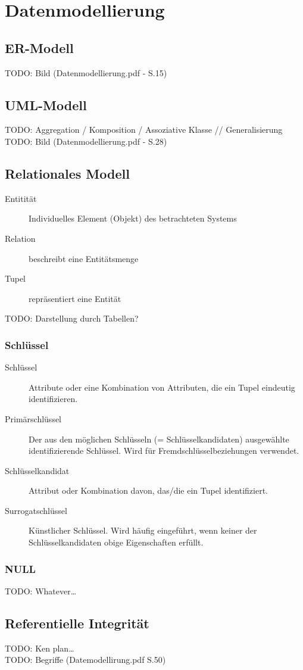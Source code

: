 \section{Datenmodellierung}
\subsection{ER-Modell}
TODO: Bild (Datenmodellierung.pdf - S.15) \\
\subsection{UML-Modell}
TODO: Aggregation / Komposition / Assoziative Klasse // Generalisierung \\
TODO: Bild (Datenmodellierung.pdf - S.28) \\
\subsection{Relationales Modell}
\begin{description}
    \item[Entitität] Individuelles Element (Objekt) des betrachteten Systems
    \item[Relation] beschreibt eine Entitätsmenge
    \item[Tupel] repräsentiert eine Entität
\end{description}
TODO: Darstellung durch Tabellen?
\subsubsection{Schlüssel}
\begin{description}
    \item[Schlüssel] Attribute oder eine Kombination von Attributen, die ein Tupel eindeutig identifizieren.
    \item[Primärschlüssel] Der aus den möglichen Schlüsseln (= Schlüsselkandidaten) ausgewählte identifizierende Schlüssel. Wird für Fremdschlüsselbeziehungen verwendet.
    \item[Schlüsselkandidat] Attribut oder Kombination davon, das/die ein Tupel identifiziert.
    \item[Surrogatschlüssel] Künstlicher Schlüssel. Wird häufig eingeführt, wenn keiner der Schlüsselkandidaten obige Eigenschaften erfüllt.
\end{description}
\subsubsection{NULL}
TODO: Whatever\ldots
\subsection{Referentielle Integrität}
TODO: Ken plan\ldots \\

TODO: Begriffe (Datemodellirung.pdf S.50) \\
